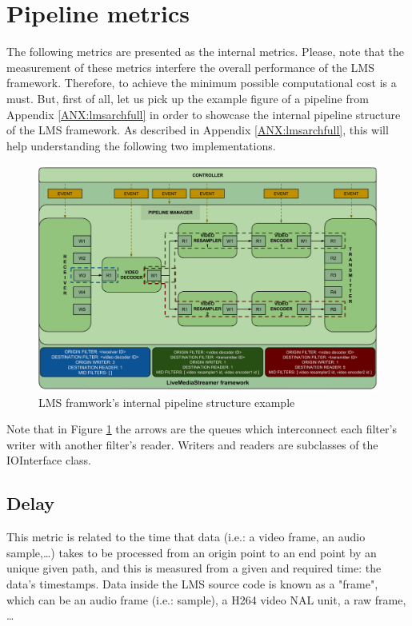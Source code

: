 \section{Pipeline metrics}

The following metrics are presented as the internal metrics. Please, note that the measurement of these metrics interfere the overall performance of the LMS framework. Therefore, to achieve the minimum possible computational cost is a must. But, first of all, let us pick up the example figure of a pipeline from Appendix \ref{ANX:lmsarchfull} in order to showcase the internal pipeline structure of the LMS framework. As described in Appendix \ref{ANX:lmsarchfull}, this will help understanding the following two implementations.

\begin{figure}[!htb]
\begin{center}
\includegraphics[width=1\textwidth]{./images/LMSpipelineBasicOne.png}
\caption{LMS framwork's internal pipeline structure example}
\label{F:lmsps}
\end{center}
\end{figure}

Note that in Figure \ref{F:lmsps} the arrows are the queues which interconnect each filter's writer with another filter's reader. Writers and readers are subclasses of the IOInterface class.

\subsection{Delay}

This metric is related to the time that data (i.e.: a video frame, an audio sample,\ldots) takes to be processed from an origin point to an end point by an unique given path, and this is measured from a given and required time: the data's timestamps. Data inside the LMS source code is known as a "frame", which can be an audio frame (i.e.: sample), a H264 video NAL unit, a raw frame, \ldots 

